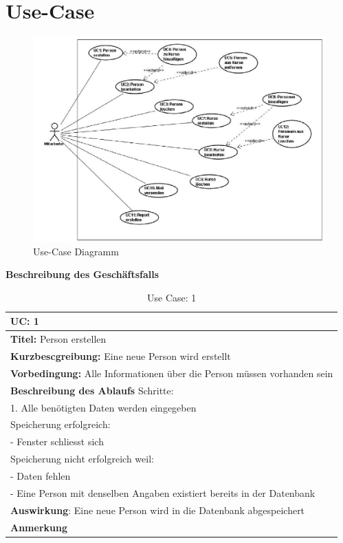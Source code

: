 \section{Use-Case}
%
\begin{figure}[ht]
\begin{center}
\includegraphics[width=15cm]{images/use-case.png}
\caption{Use-Case Diagramm}
\end{center}
\end{figure}
\clearpage
\textbf{Beschreibung des Geschäftsfalls}
\begin{table}[ht]
\caption{Use Case: 1}
\begin{tabular}[hl]{|p{15cm}|}
  \hline
  \textbf{UC:} 1\\
  \hline
  \textbf{Titel:}  Person erstellen\\
  \hline
  \textbf{Kurzbescgreibung:}  Eine neue Person wird erstellt\\
  \hline
  \textbf{Vorbedingung:} Alle Informationen über die Person müssen vorhanden sein\\
  \hline
  \textbf{Beschreibung des Ablaufs} Schritte:\\
1. Alle benötigten Daten werden eingegeben\\
Speicherung erfolgreich:\\
- Fenster schliesst sich\\
Speicherung nicht erfolgreich weil:\\
- Daten fehlen\\
- Eine Person mit denselben Angaben existiert bereits in der Datenbank\\
  \hline
  \textbf{Auswirkung}: Eine neue Person wird in die Datenbank abgespeichert\\
  \hline
  \textbf{Anmerkung}\\
  \hline
\end{tabular}
\end{table}
